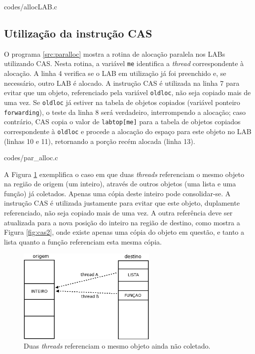\documentclass[ccc, pg2]{esinucpel}
\begin{document}

								 {codes/allocLAB.c}

\subsection{Utilização da instrução CAS} \label{sec:cas}
O programa \ref{src:paralloc} mostra a rotina de alocação paralela nos LABs utilizando CAS. Nesta rotina, a variável {\tt me} identifica a {\it thread} correspondente à alocação. A linha 4 verifica se o LAB em utilização já foi preenchido e, se necessário, outro LAB é alocado. A instrução CAS é utilizada na linha 7 para evitar que um objeto, referenciado pela variável {\tt oldloc}, não seja copiado mais de uma vez. Se {\tt oldloc} já estiver na tabela de objetos copiados (variável ponteiro {\tt forwarding}), o teste da linha 8 será verdadeiro, interrompendo a alocação; caso contrário, CAS copia o valor de {\tt labtop[me]} para a tabela de objetos copiados correspondente à {\tt oldloc} e procede a alocação do espaço para este objeto no LAB (linhas 10 e 11), retornando a porção recém alocada (linha 13).



								 {codes/par_alloc.c}


A Figura \ref{fig:cas1} exemplifica o caso em que duas {\it threads} referenciam o mesmo objeto na região de origem (um inteiro), através de outros objetos (uma lista e uma função) já coletados. Apenas uma cópia deste inteiro pode consolidar-se. A instrução CAS é utilizada justamente para evitar que este objeto, duplamente referenciado, não seja copiado mais de uma vez. A outra referência deve ser atualizada para a nova posição do inteiro na região de destino, como mostra a Figura \ref{fig:cas2}, onde existe apenas uma cópia do objeto em questão, e tanto a lista quanto a função referenciam esta mesma cópia.

\begin{figure}[h]
\centering
\includegraphics[width=0.6\textwidth]{images/CAS1.png}
\caption{Duas {\it threads} referenciam o mesmo objeto ainda não coletado.}
\label{fig:cas1}
\end{figure}
\end{document}
